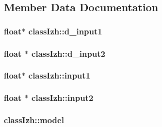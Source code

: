 \subsection{Member Data Documentation}
\hypertarget{classclassIzh_aeb9e8508d594332f804590f8b59a0f7f}{
\subsubsection[{d\+\_\+input1}]{\setlength{\rightskip}{0pt plus 5cm}float$\ast$ class\+Izh\+::d\+\_\+input1}}\label{classclassIzh_aeb9e8508d594332f804590f8b59a0f7f}
\hypertarget{classclassIzh_a7eaec632e8a4d4dc55847bbb443ec1dd}{
\subsubsection[{d\+\_\+input2}]{\setlength{\rightskip}{0pt plus 5cm}float $\ast$ class\+Izh\+::d\+\_\+input2}}\label{classclassIzh_a7eaec632e8a4d4dc55847bbb443ec1dd}
\hypertarget{classclassIzh_acbda3bf4f3357bd233f6fe2294965500}{
\subsubsection[{input1}]{\setlength{\rightskip}{0pt plus 5cm}float$\ast$ class\+Izh\+::input1}}\label{classclassIzh_acbda3bf4f3357bd233f6fe2294965500}
\hypertarget{classclassIzh_a600d51ce808dffee6fbce81f6681791b}{
\subsubsection[{input2}]{\setlength{\rightskip}{0pt plus 5cm}float $\ast$ class\+Izh\+::input2}}\label{classclassIzh_a600d51ce808dffee6fbce81f6681791b}
\hypertarget{classclassIzh_ad5e7af3f3f65bb85830ce41efff7875e}{
\subsubsection[{model}]{ class\+Izh\+::model}}\label{classclassIzh_ad5e7af3f3f65bb85830ce41efff7875e}
